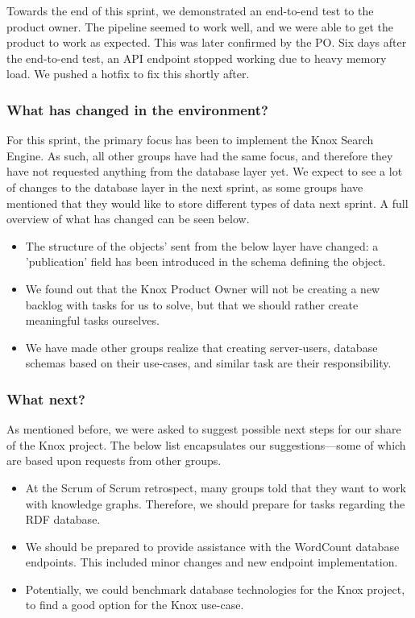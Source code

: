Towards the end of this sprint, we demonstrated an end-to-end test to the \knox{} product owner. The pipeline seemed to work well, and we were able to get the product to work as expected. This was later confirmed by the PO. Six days after the end-to-end test, an API endpoint stopped working due to heavy memory load. We pushed a hotfix to fix this shortly after.

\subsubsection{What has changed in the environment?}
For this sprint, the primary focus has been to implement the Knox Search Engine. As such, all other groups have had the same focus, and therefore they have not requested anything from the database layer yet. We expect to see a lot of changes to the database layer in the next sprint, as some groups have mentioned that they would like to store different types of data next sprint.
A full overview of what has changed can be seen below.

\begin{itemize}
    \item The structure of the objects' sent from the below layer have changed: a 'publication' field has been introduced in the schema defining the object.
    \item We found out that the Knox Product Owner will not be creating a new backlog with tasks for us to solve, but that we should rather create meaningful tasks ourselves.
    \item We have made other groups realize that creating server-users, database schemas based on their use-cases, and similar task are their responsibility.
\end{itemize}

\subsubsection{What next?}
As mentioned before, we were asked to suggest possible next steps for our share of the Knox project. The below list encapsulates our suggestions---some of which are based upon requests from other groups.

\begin{itemize}
    \item At the Scrum of Scrum retrospect, many groups told that they want to work with knowledge graphs. Therefore, we should prepare for tasks regarding the RDF database.
    \item We should be prepared to provide assistance with the WordCount database endpoints. This included minor changes and new endpoint implementation.
    \item Potentially, we could benchmark database technologies for the Knox project, to find a good option for the Knox use-case.
\end{itemize}